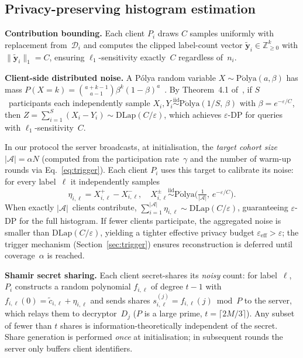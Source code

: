 \documentclass[runningheads]{llncs}
\begin{document}
\subsection{Privacy-preserving histogram estimation}\label{sec:histogram}

\textbf{Contribution bounding.}
Each client $P_i$ draws $C$ samples uniformly with replacement from~$\mathcal{D}_i$ and computes the clipped label-count vector $\tilde{\mathbf{y}}_i\!\in\!\mathbb{Z}_{\ge0}^k$ with $\|\tilde{\mathbf{y}}_i\|_1\!=\!C$, ensuring $\ell_1$-sensitivity exactly~$C$ regardless of~$n_i$.

\textbf{Client-side distributed noise.}
A P\'{o}lya random variable $X\!\sim\!\mathrm{P\acute{o}lya}(a,\beta)$ has mass $P(X\!=\!k)=\binom{a+k-1}{a-1}\beta^{k}(1-\beta)^{a}$~\cite{ref_fed_heatmap}.
By Theorem~4.1 of~\cite{ref_fed_heatmap}, if $S$~participants each independently sample $X_i,Y_i\!\overset{\mathrm{iid}}{\sim}\!\mathrm{P\acute{o}lya}(1/S,\,\beta)$ with $\beta=e^{-\varepsilon/C}$, then $Z=\sum_{i=1}^{S}(X_i-Y_i)\sim\mathrm{DLap}(C/\varepsilon)$, which achieves $\varepsilon$-DP for queries with $\ell_1$-sensitivity~$C$.

In our protocol the server broadcasts, at initialisation, the \emph{target cohort size} $|\mathcal{A}|=\alpha N$ (computed from the participation rate~$\gamma$ and the number of warm-up rounds via Eq.~\eqref{eq:trigger}).
Each client $P_i$ uses this target to calibrate its noise: for every label~$\ell$ it independently samples
\begin{equation}\label{eq:partial_noise}
    \eta_{i,\ell} = X_{i,\ell}^{+}-X_{i,\ell}^{-},\quad X_{i,\ell}^{\pm}\!\overset{\mathrm{iid}}{\sim}\!\mathrm{P\acute{o}lya}\!\bigl(\tfrac{1}{|\mathcal{A}|},\,e^{-\varepsilon/C}\bigr).
\end{equation}
When exactly $|\mathcal{A}|$~clients contribute, $\sum_{i=1}^{|\mathcal{A}|}\eta_{i,\ell}\sim\mathrm{DLap}(C/\varepsilon)$, guaranteeing $\varepsilon$-DP for the full histogram.
If fewer clients participate, the aggregated noise is smaller than $\mathrm{DLap}(C/\varepsilon)$, yielding a tighter effective privacy budget $\varepsilon_{\mathrm{eff}}>\varepsilon$; the trigger mechanism (Section~\ref{sec:trigger}) ensures reconstruction is deferred until coverage~$\alpha$ is reached.

\textbf{Shamir secret sharing.}
Each client secret-shares its \emph{noisy} count: for label~$\ell$, $P_i$ constructs a random polynomial $f_{i,\ell}$ of degree $t\!-\!1$ with $f_{i,\ell}(0)=\tilde{c}_{i,\ell}+\eta_{i,\ell}$ and sends shares $s_{i,\ell}^{(j)}=f_{i,\ell}(j)\bmod P$ to the server, which relays them to decryptor~$D_j$ ($P$ is a large prime, $t=\lceil 2M/3\rceil$).
Any subset of fewer than $t$ shares is information-theoretically independent of the secret.
Share generation is performed \emph{once} at initialisation; in subsequent rounds the server only buffers client identifiers.
\end{document}
